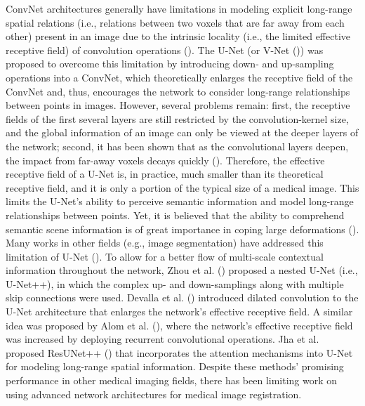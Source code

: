 \documentclass[times,twocolumn,final]{elsarticle}
\begin{document}
ConvNet architectures generally have limitations in modeling explicit long-range spatial relations (i.e., relations between two voxels that are far away from each other) present in an image due to the intrinsic locality (i.e., the limited effective receptive field) of convolution operations (\cite{luo2016understanding}). The U-Net (or V-Net (\cite{milletari2016v})) was proposed to overcome this limitation by introducing down- and up-sampling operations into a ConvNet, which theoretically enlarges the receptive field of the ConvNet and, thus, encourages the network to consider long-range relationships between points in images. However, several problems remain: first, the receptive fields of the first several layers are still restricted by the convolution-kernel size, and the global information of an image can only be viewed at the deeper layers of the network; second, it has been shown that as the convolutional layers deepen, the impact from far-away voxels decays quickly (\cite{li2021medical}). Therefore, the effective receptive field of a U-Net is, in practice, much smaller than its theoretical receptive field, and it is only a portion of the typical size of a medical image. This limits the U-Net's ability to perceive semantic information and model long-range relationships between points. Yet, it is believed that the ability to comprehend semantic scene information is of great importance in coping large deformations (\cite{ha2020semantically}). Many works in other fields (e.g., image segmentation) have addressed this limitation of U-Net (\cite{zhou2019unet++, jha2019resunet++, devalla2018drunet, alom2018recurrent}). To allow for a better flow of multi-scale contextual information throughout the network, Zhou et al. (\cite{zhou2019unet++}) proposed a nested U-Net (i.e., U-Net++), in which the complex up- and down-samplings along with multiple skip connections were used. Devalla et al. (\cite{devalla2018drunet}) introduced dilated convolution to the U-Net architecture that enlarges the network's effective receptive field. A similar idea was proposed by Alom et al. (\cite{alom2018recurrent}), where the network's effective receptive field was increased by deploying recurrent convolutional operations. Jha et al. proposed ResUNet++ (\cite{jha2019resunet++}) that incorporates the attention mechanisms into U-Net for modeling long-range spatial information. Despite these methods' promising performance in other medical imaging fields, there has been limiting work on using advanced network architectures for medical image registration.
\end{document}
